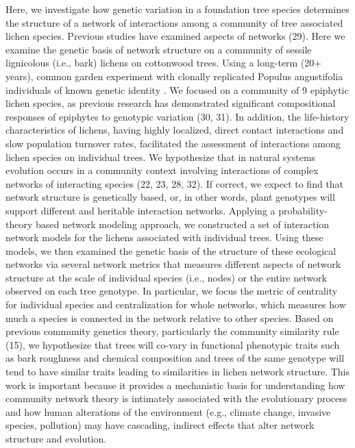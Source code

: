 \documentclass{article}
\begin{document}
Here, we investigate how genetic variation in a foundation tree species determines the structure of a network of
interactions among a community of tree associated lichen species. Previous studies have examined aspects of networks
(29). Here we examine the genetic basis of network structure on a community of sessile lignicolous (i.e., bark) lichens
on cottonwood trees. Using a long-term (20+ years), common garden experiment with clonally replicated Populus
angustifolia individuals of known genetic identity . We focused on a community of 9 epiphytic lichen species, as
previous research has demonstrated significant compositional responses of epiphytes to genotypic variation (30, 31). In
addition, the life-history characteristics of lichens, having highly localized, direct contact interactions and slow
population turnover rates, facilitated the assessment of interactions among lichen species on individual trees. We
hypothesize that in natural systems evolution occurs in a community context involving interactions of complex networks
of interacting species (22, 23, 28, 32). If correct, we expect to find that network structure is genetically based, or,
in other words, plant genotypes will support different and heritable interaction networks. Applying a
probability-theory based network modeling approach, we constructed a set of interaction network models for the lichens
associated with individual trees. Using these models, we then examined the genetic basis of the structure of these
ecological networks via several network metrics that measures different aspects of network structure at the scale of
individual species (i.e., nodes) or the entire network observed on each tree genotype. In particular, we focus the
metric of centrality for individual species and centralization for whole networks, which measures how much a species is
connected in the network relative to other species. Based on previous community genetics theory, particularly the
community similarity rule (15), we hypothesize that trees will co-vary in functional phenotypic traits such as bark
roughness and chemical composition and trees of the same genotype will tend to have similar traits leading to
similarities in lichen network structure. This work is important because it provides a mechanistic basis for
understanding how community network theory is intimately associated with the evolutionary process and how human
alterations of the environment (e.g., climate change, invasive species, pollution) may have cascading, indirect effects
that alter network structure and evolution.
\end{document}
